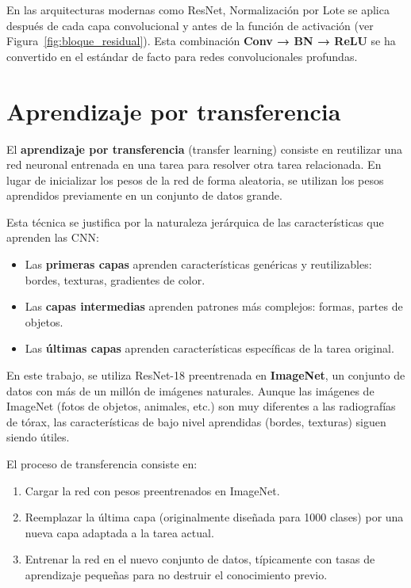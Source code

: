 En las arquitecturas modernas como ResNet, Normalización por Lote se aplica después de cada capa convolucional y antes de la función de activación (ver Figura~\ref{fig:bloque_residual}). Esta combinación \textbf{Conv → BN → ReLU} se ha convertido en el estándar de facto para redes convolucionales profundas.


\section{Aprendizaje por transferencia}
\label{sec:transfer_learning}

El \textbf{aprendizaje por transferencia} (transfer learning) consiste en reutilizar una red neuronal entrenada en una tarea para resolver otra tarea relacionada. En lugar de inicializar los pesos de la red de forma aleatoria, se utilizan los pesos aprendidos previamente en un conjunto de datos grande.

Esta técnica se justifica por la naturaleza jerárquica de las características que aprenden las CNN:
\begin{itemize}
    \item Las \textbf{primeras capas} aprenden características genéricas y reutilizables: bordes, texturas, gradientes de color.
    \item Las \textbf{capas intermedias} aprenden patrones más complejos: formas, partes de objetos.
    \item Las \textbf{últimas capas} aprenden características específicas de la tarea original.
\end{itemize}

En este trabajo, se utiliza ResNet-18 preentrenada en \textbf{ImageNet}, un conjunto de datos con más de un millón de imágenes naturales. Aunque las imágenes de ImageNet (fotos de objetos, animales, etc.) son muy diferentes a las radiografías de tórax, las características de bajo nivel aprendidas (bordes, texturas) siguen siendo útiles.

El proceso de transferencia consiste en:
\begin{enumerate}
    \item Cargar la red con pesos preentrenados en ImageNet.
    \item Reemplazar la última capa (originalmente diseñada para 1000 clases) por una nueva capa adaptada a la tarea actual.
    \item Entrenar la red en el nuevo conjunto de datos, típicamente con tasas de aprendizaje pequeñas para no destruir el conocimiento previo.
\end{enumerate}

